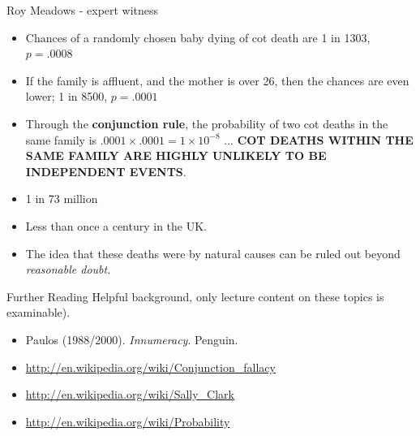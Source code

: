 \documentclass{beamer}
\begin{document}
\begin{frame}{Roy Meadows - expert witness}
\begin{itemize}
\item Chances of a randomly chosen baby dying of cot death are 1 in 1303, $p = .0008$
\item If the family is affluent, and the mother is over 26, then the chances are even lower; 1 in 8500, $p = .0001$
\item Through the \textbf{conjunction rule}, the probability of two cot deaths in the same family is $ .0001 \times .0001 = 1 \times 10^{-8}$ ... \textbf{COT DEATHS WITHIN THE SAME FAMILY ARE HIGHLY UNLIKELY TO BE INDEPENDENT EVENTS}.
\item 1 in 73 million
\item Less than once a century in the UK.
\item The idea that these deaths were by natural causes can be ruled out beyond \emph{reasonable doubt}.
\end{itemize}
\end{frame}

\begin{frame}{Further Reading}
Helpful background, only lecture content on these topics is examinable).
\begin{itemize}
\item Paulos (1988/2000). \emph{Innumeracy}. Penguin.
\item  \url{http://en.wikipedia.org/wiki/Conjunction_fallacy}
\item  \url{http://en.wikipedia.org/wiki/Sally_Clark}
\item  \url{http://en.wikipedia.org/wiki/Probability}
\end{itemize}
\end{frame}
\end{document}
